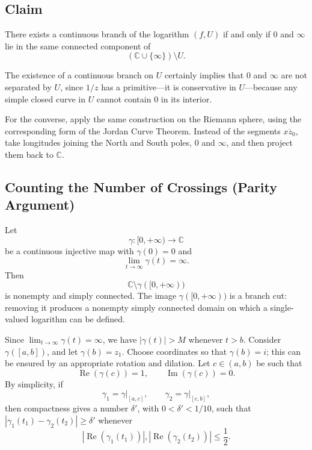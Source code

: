 \documentclass[11pt,a4paper]{article}
\begin{document}

\subsection*{Claim}

There exists a continuous branch of the logarithm $(f,U)$ if and only if $0$ and $\infty$ lie in the same connected component of
\[
  (\mathbb C\cup\{\infty\})\setminus U.
\]

The existence of a continuous branch on $U$ certainly implies that $0$ and $\infty$ are not separated by $U$, since $1/z$ has a primitive---it is conservative in $U$---because any simple closed curve in $U$ cannot contain $0$ in its interior.

For the converse, apply the same construction on the Riemann sphere, using the corresponding form of the Jordan Curve Theorem. Instead of the segments $\overline{xz_0}$, take longitudes joining the North and South poles, $0$ and $\infty$, and then project them back to $\mathbb C$.

\subsection*{Counting the Number of Crossings (Parity Argument)}

Let
\[
  \gamma:[0,+\infty)\to\mathbb C
\]
be a continuous injective map with $\gamma(0)=0$ and
\[
  \lim_{t\to\infty}\gamma(t)=\infty.
\]
Then
\[
  \mathbb C\setminus\gamma([0,+\infty))
\]
is nonempty and simply connected. The image $\gamma([0,+\infty))$ is a branch cut: removing it produces a nonempty simply connected domain on which a single-valued logarithm can be defined.


Since $\lim_{t\to\infty}\gamma(t)=\infty$, we have $|\gamma(t)|>M$ whenever $t>b$. Consider $\gamma([a,b])$, and let $\gamma(b)=z_1$. Choose coordinates so that $\gamma(b)=i$; this can be ensured by an appropriate rotation and dilation. Let $c\in(a,b)$ be such that
\[
  \operatorname{Re}(\gamma(c))=1,
  \qquad
  \operatorname{Im}(\gamma(c))=0.
\]
By simplicity, if
\[
  \gamma_1=\left.\gamma\right|_{[a,c]},
  \qquad
  \gamma_2=\left.\gamma\right|_{[c,b]},
\]
then compactness gives a number $\delta'$, with $0<\delta'<1/10$, such that \(|\gamma_1(t_1)-\gamma_2(t_2)|\ge\delta'\)
whenever
\[
  |\operatorname{Re}(\gamma_1(t_1))|,
  |\operatorname{Re}(\gamma_2(t_2))|\le\frac12.
\]
\end{document}
